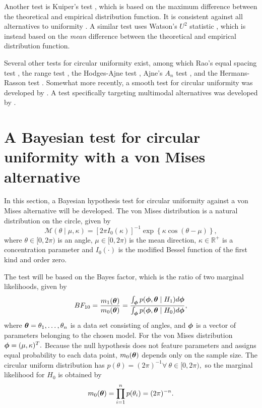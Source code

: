 Another test is Kuiper's test \citep{kuiper1960tests}, which is based on the maximum difference between the theoretical and empirical distribution function. It is consistent against all alternatives to uniformity \citep{mardia2009directional}. 
A similar test uses Watson's \( U^2 \) statistic \citep{watson1961goodness}, which is instead based on the \textit{mean} difference between the theoretical and empirical distribution function. 

Several other tests for circular uniformity exist, among which Rao's equal spacing test \citep{rao1976some}, the range test \citep{laubscher1968distribution}, the Hodges-Ajne test \citep{hodges1955bivariate, ajne1968simple}, Ajne's \(A_n\) test \citep{ajne1968simple}, and the Hermans-Rasson test \citep{hermans1985new}. Somewhat more recently, a smooth test for circular uniformity was developed by \citet{bogdan2002data}. A test specifically targeting multimodal alternatives was developed by \citet{pycke2010some}.



\section{A Bayesian test for circular uniformity with a von Mises alternative} \label{isotestvm}

In this section, a Bayesian hypothesis test for circular uniformity against a von Mises alternative will be developed. The von Mises distribution is a natural distribution on the circle, given by
\begin{equation}
\mathcal{M} (\theta \mid \mu, \kappa) = \left[ 2 \pi I_0 (\kappa) \right]^{-1} \exp \left\{ \kappa \cos (\theta - \mu) \right\},
\end{equation}
where \( \theta \in [0, 2\pi) \) is an angle, \( \mu \in [0, 2 \pi) \) is the mean direction, \( \kappa \in \mathbb{R}^+ \) is a concentration parameter and \( I_0(\cdot) \) is the modified Bessel function of the first kind and order zero.

The test will be based on the Bayes factor, which is the ratio of two marginal likelihoods, given by
\begin{equation}
BF_{10} = \frac{ m_1( \boldsymbol{\theta} ) }{ m_0( \boldsymbol{\theta} ) } = \frac{\int_{\boldsymbol{\phi}} p(\boldsymbol{\phi}, \boldsymbol{\theta} \mid H_1)  d\boldsymbol{\phi}}{\int_{\boldsymbol{\phi}} p(\boldsymbol{\phi}, \boldsymbol{\theta} \mid H_0)  d\boldsymbol{\phi}},
\end{equation}
where \( \boldsymbol{\theta} = \theta_1, \dots, \theta_n \) is a data set consisting of angles, and \( \boldsymbol{\phi} \) is a vector of parameters belonging to the chosen model. For the von Mises distribution \( \boldsymbol{\phi} =  ( \mu, \kappa )^T.\) Because the null hypothesis does not feature parameters and assigns equal probability to each data point, \( m_0(\boldsymbol{\theta}) \) depends only on the sample size. The circular uniform distribution has \( p(\theta ) = (2 \pi )^{-1} \forall ~ \theta \in [0, 2\pi),\) so the marginal likelihood for \(H_0\) is obtained by
\begin{equation}
m_0 (\boldsymbol{\theta}) = \prod_{i = 1}^n p(\theta_i) = (2 \pi )^{-n}.
\end{equation}


